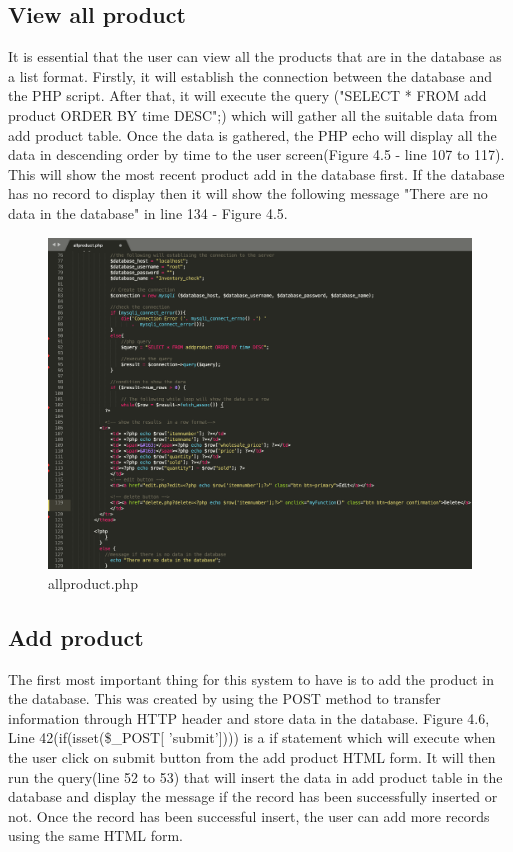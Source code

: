 \subsection{View all product}
It is essential that the user can view all the products that are in the database as a list format. Firstly, it will establish the connection between the database and the PHP script. After that, it will execute the query ("SELECT * FROM add product ORDER BY time DESC";) which will gather all the suitable data from add product table. Once the data is gathered, the PHP echo will display all the data in descending order by time to the user screen(Figure 4.5 - line 107 to 117). This will show the most recent product add in the database first. If the database has no record to display then it will show the following message "There are no data in the database" in line 134 - Figure 4.5.

\begin{figure}[H]
\centering
    \includegraphics[scale=0.35]
    {implement_image/viewallproduct.png}
    \caption{allproduct.php}
    \label{fig:allproduct.php}
\end{figure}

\subsection{Add product}
The first most important thing for this system to have is to add the product in the database. This was created by using the POST method to transfer information through HTTP header and store data in the database. Figure 4.6, Line 42(if(isset(\$\_POST[ 'submit']))) is a if statement which will execute when the user click on submit button from the add product HTML form. It will then run the query(line 52 to 53) that will insert the data in add product table in the database and display the message if the record has been successfully inserted or not. Once the record has been successful insert, the user can add more records using the same HTML form. 

